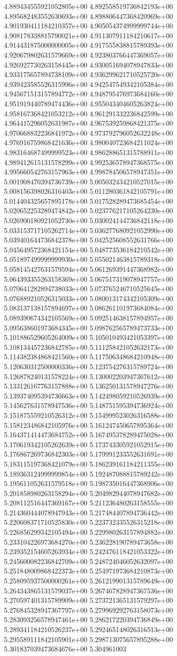4.889434555921052805e+00	4.892558519736842193e+00	4.895682483552630693e+00	4.898806447368420969e+00	4.901930411184210357e+00	4.905054374999999744e+00	4.908178338815790021e+00	4.911307911184210617e+00	4.914431875000000005e+00	4.917555838815789393e+00	4.920679802631579669e+00	4.923803766447369057e+00	4.926927730263158445e+00	4.930051694078947833e+00	4.933175657894738109e+00	4.936299621710525720e+00	4.939423585526315996e+00	4.942547549342105384e+00	4.945671513157894772e+00	4.948795476973684160e+00	4.951919440789474436e+00	4.955043404605263824e+00	4.958167368421053212e+00	4.961291332236842599e+00	4.964415296052631987e+00	4.967539259868421375e+00	4.970668832236841972e+00	4.973792796052632248e+00	4.976916759868421636e+00	4.980040723684211024e+00	4.983164687499999523e+00	4.986288651315788911e+00	4.989412615131578299e+00	4.992536578947368575e+00	4.995660542763157963e+00	4.998784506578947351e+00	5.001908470394736739e+00	5.005032434210527015e+00	5.008156398026316403e+00	5.011280361842105791e+00	5.014404325657895178e+00	5.017528289473685454e+00	5.020652253289474842e+00	5.023776217105264230e+00	5.026900180921052730e+00	5.030024144736842118e+00	5.033153717105262714e+00	5.036277680921052990e+00	5.039401644736842378e+00	5.042525608552631766e+00	5.045649572368421154e+00	5.048773536184210542e+00	5.051897499999999930e+00	5.055021463815789318e+00	5.058145427631579594e+00	5.061269391447368982e+00	5.064393355263158369e+00	5.067517319078947757e+00	5.070641282894738033e+00	5.073765246710525645e+00	5.076889210526315033e+00	5.080013174342105309e+00	5.083137138157894697e+00	5.086261101973684084e+00	5.089390674342105569e+00	5.092514638157894957e+00	5.095638601973684345e+00	5.098762565789473733e+00	5.101886529605264009e+00	5.105010493421053397e+00	5.108134457236842785e+00	5.111258421052632173e+00	5.114382384868421560e+00	5.117506348684210948e+00	5.120630312500000336e+00	5.123754276315789724e+00	5.126878240131578224e+00	5.130002203947367612e+00	5.133126167763157888e+00	5.136250131578947276e+00	5.139374095394736663e+00	5.142498059210526939e+00	5.145627631578947536e+00	5.148751595394736924e+00	5.151875559210526312e+00	5.154999523026316588e+00	5.158123486842105976e+00	5.161247450657895364e+00	5.164371414473684752e+00	5.167495378289475028e+00	5.170619342105262639e+00	5.173743305921052915e+00	5.176867269736842303e+00	5.179991233552631691e+00	5.183115197368421079e+00	5.186239161184211355e+00	5.189363124999999854e+00	5.192487088815789242e+00	5.195611052631579518e+00	5.198735016447368906e+00	5.201858980263158294e+00	5.204982944078947682e+00	5.208112516447369167e+00	5.211236480263158555e+00	5.214360444078947943e+00	5.217484407894736442e+00	5.220608371710525830e+00	5.223732335526315218e+00	5.226856299342105494e+00	5.229980263157894882e+00	5.233104226973684270e+00	5.236228190789473658e+00	5.239352154605263934e+00	5.242476118421053322e+00	5.245600082236842709e+00	5.248724046052632097e+00	5.251848009868422373e+00	5.254971973684210873e+00	5.258095937500000261e+00	5.261219901315789649e+00	5.264343865131579037e+00	5.267467828947367536e+00	5.270597401315789909e+00	5.273721365131579297e+00	5.276845328947367797e+00	5.279969292763158073e+00	5.283093256578947461e+00	5.286217220394736849e+00	5.289341184210526237e+00	5.292465148026316513e+00	5.295589111842105901e+00	5.298713075657895288e+00	5.301837039473684676e+00	5.304961003
